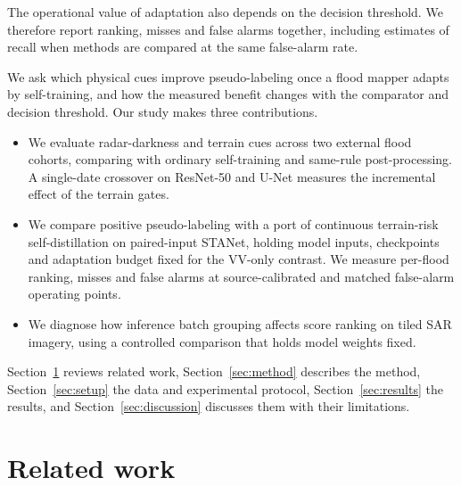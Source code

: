 \documentclass[a4paper,fleqn]{cas-sc}
\begin{document}
The operational value of adaptation also depends on the decision threshold. We therefore report ranking, misses and false alarms together, including estimates of recall when methods are compared at the same false-alarm rate.

We ask which physical cues improve pseudo-labeling once a flood mapper adapts by self-training, and how the measured benefit changes with the comparator and decision threshold. Our study makes three contributions.
\begin{itemize}
\item We evaluate radar-darkness and terrain cues across two external flood cohorts, comparing with ordinary self-training and same-rule post-processing. A single-date crossover on ResNet-50 and U-Net measures the incremental effect of the terrain gates.
\item We compare positive pseudo-labeling with a port of continuous terrain-risk self-distillation on paired-input STANet, holding model inputs, checkpoints and adaptation budget fixed for the VV-only contrast. We measure per-flood ranking, misses and false alarms at source-calibrated and matched false-alarm operating points.
\item We diagnose how inference batch grouping affects score ranking on tiled SAR imagery, using a controlled comparison that holds model weights fixed.
\end{itemize}

Section~\ref{sec:related} reviews related work, Section~\ref{sec:method} describes the method, Section~\ref{sec:setup} the data and experimental protocol, Section~\ref{sec:results} the results, and Section~\ref{sec:discussion} discusses them with their limitations.

\section{Related work}
\label{sec:related}
\end{document}
